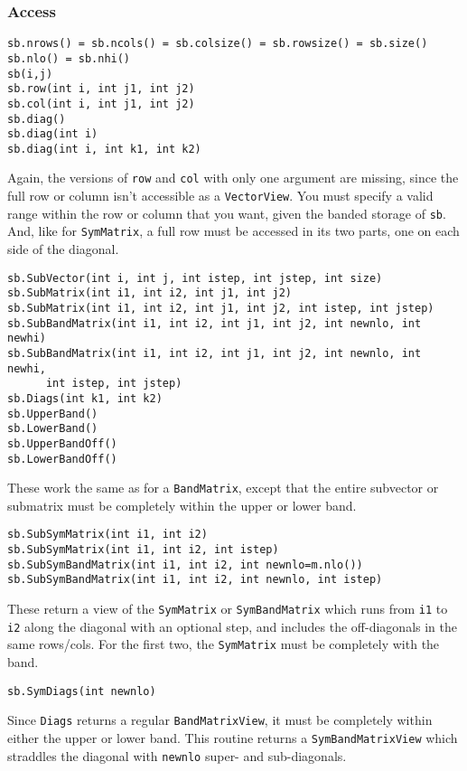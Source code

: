 \documentclass[twoside,letterpaper,11pt]{article}
\renewcommand{\tt}[1]{{\texttt {#1}}}
\begin{document}
\subsubsection{Access}

\begin{verbatim}
sb.nrows() = sb.ncols() = sb.colsize() = sb.rowsize() = sb.size()
sb.nlo() = sb.nhi()
sb(i,j)
sb.row(int i, int j1, int j2)
sb.col(int i, int j1, int j2)
sb.diag()
sb.diag(int i)
sb.diag(int i, int k1, int k2)
\end{verbatim}
Again, the versions of \tt{row} and \tt{col} with only one argument are
missing, since the full row or column isn't accessible as a \tt{VectorView}.
You must specify a valid range within the row or column that you want, 
given the banded storage of \tt{sb}.  And, like for \tt{SymMatrix}, a full row
must be accessed in its two parts, one on each side of the diagonal.

\begin{verbatim}
sb.SubVector(int i, int j, int istep, int jstep, int size)
sb.SubMatrix(int i1, int i2, int j1, int j2)
sb.SubMatrix(int i1, int i2, int j1, int j2, int istep, int jstep)
sb.SubBandMatrix(int i1, int i2, int j1, int j2, int newnlo, int newhi)
sb.SubBandMatrix(int i1, int i2, int j1, int j2, int newnlo, int newhi, 
      int istep, int jstep)
sb.Diags(int k1, int k2)
sb.UpperBand()
sb.LowerBand()
sb.UpperBandOff()
sb.LowerBandOff()
\end{verbatim}
These work the same as for a \tt{BandMatrix}, except that the entire
subvector or submatrix must be completely within the upper or lower band.


\begin{verbatim}
sb.SubSymMatrix(int i1, int i2)
sb.SubSymMatrix(int i1, int i2, int istep)
sb.SubSymBandMatrix(int i1, int i2, int newnlo=m.nlo())
sb.SubSymBandMatrix(int i1, int i2, int newnlo, int istep)
\end{verbatim}
These return a view of the \tt{SymMatrix} or \tt{SymBandMatrix} which runs
from \tt{i1} to \tt{i2} along the diagonal with an optional step,
and includes the off-diagonals in the same rows/cols.  For the first two,
the \tt{SymMatrix} must be completely with the band.

\begin{verbatim}
sb.SymDiags(int newnlo)
\end{verbatim}
Since \tt{Diags} returns a regular \tt{BandMatrixView}, it must be completely
within either the upper or lower band.  This routine returns a \tt{SymBandMatrixView}
which straddles the diagonal with \tt{newnlo} super- and sub-diagonals.
\end{document}
